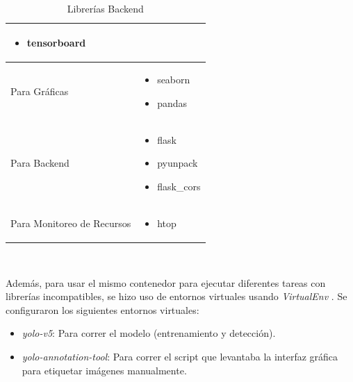 \begin{itemize}
\begin{itemize}
\begin{table}[h!]
\begin{tabular}{ | m{5cm} | m{4cm} |}
\begin{itemize}
                                                    \item tensorboard
                                                \end{itemize}\\
                \hline
                Para Gráficas               &   \begin{itemize}
                                                    \item seaborn
                                                    \item pandas
                                                \end{itemize}\\
                \hline
                Para Backend                &   \begin{itemize}
                                                    \item flask
                                                    \item pyunpack
                                                    \item flask\_cors
                                                \end{itemize}\\
                \hline
                Para Monitoreo de Recursos  &   \begin{itemize}
                                                    \item htop
                                                \end{itemize}\\
                \hline
            \end{tabular}\\
            \caption{Librerías Backend}
            \label{librerias-be}
        \end{table}
    \end{itemize}
\end{itemize}
Además, para usar el mismo contenedor para ejecutar diferentes tareas con librerías incompatibles, se hizo uso de entornos virtuales usando \textit{VirtualEnv} \cite{virtualenv}. Se configuraron los siguientes entornos virtuales:
\begin{itemize}
    \item \textit{yolo-v5}: Para correr el modelo (entrenamiento y detección).
    \item \textit{yolo-annotation-tool}: Para correr el script que levantaba la interfaz gráfica para etiquetar imágenes manualmente.
\end{itemize}


